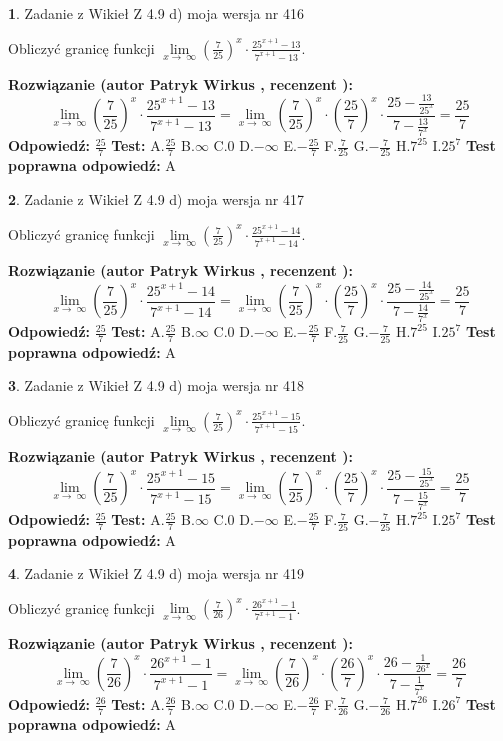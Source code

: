 \documentclass[12pt, a4paper]{article}
\theoremstyle{definition} %
\newtheorem{zad}{}
\newcommand{\zadStart}[1]{\begin{zad}#1\newline}
\newcommand{\zadStop}{\end{zad}}
\newcommand{\rozwStart}[2]{\noindent \textbf{Rozwiązanie (autor #1 , recenzent #2): }\newline}
\newcommand{\rozwStop}{\newline}
\newcommand{\odpStart}{\noindent \textbf{Odpowiedź:}\newline}
\newcommand{\odpStop}{\newline}
\newcommand{\testStart}{\noindent \textbf{Test:}\newline}
\newcommand{\testStop}{\newline}
\newcommand{\kluczStart}{\noindent \textbf{Test poprawna odpowiedź:}\newline}
\newcommand{\kluczStop}{\newline}
\begin{document}
\zadStart{Zadanie z Wikieł Z 4.9 d) moja wersja nr 416}


Obliczyć granicę funkcji  $\lim\limits_{x\to\ \infty}(\frac{7}{25})^{x}\cdot\frac{25^{x+1}-13}{7^{x+1}-13}$.
\zadStop
\rozwStart{Patryk Wirkus}{}
$$\lim\limits_{x\to\ \infty}(\frac{7}{25})^{x}\cdot\frac{25^{x+1}-13}{7^{x+1}-13}=\lim\limits_{x\to\ \infty}(\frac{7}{25})^{x}\cdot(\frac{25}{7})^{x} \cdot \frac{25-\frac{13}{25^{x}}}{7-\frac{13}{7^{x}}} = \frac{25}{7}$$
\rozwStop
\odpStart
$\frac{25}{7}$
\odpStop
\testStart
A.$\frac{25}{7}$ B.$\infty$ C.$0$ D.$-\infty$ E.$-\frac{25}{7}$
F.$\frac{7}{25}$ G.$-\frac{7}{25}$
H.$7^{25}$
I.$25^{7}$
\testStop
\kluczStart
A
\kluczStop



\zadStart{Zadanie z Wikieł Z 4.9 d) moja wersja nr 417}


Obliczyć granicę funkcji  $\lim\limits_{x\to\ \infty}(\frac{7}{25})^{x}\cdot\frac{25^{x+1}-14}{7^{x+1}-14}$.
\zadStop
\rozwStart{Patryk Wirkus}{}
$$\lim\limits_{x\to\ \infty}(\frac{7}{25})^{x}\cdot\frac{25^{x+1}-14}{7^{x+1}-14}=\lim\limits_{x\to\ \infty}(\frac{7}{25})^{x}\cdot(\frac{25}{7})^{x} \cdot \frac{25-\frac{14}{25^{x}}}{7-\frac{14}{7^{x}}} = \frac{25}{7}$$
\rozwStop
\odpStart
$\frac{25}{7}$
\odpStop
\testStart
A.$\frac{25}{7}$ B.$\infty$ C.$0$ D.$-\infty$ E.$-\frac{25}{7}$
F.$\frac{7}{25}$ G.$-\frac{7}{25}$
H.$7^{25}$
I.$25^{7}$
\testStop
\kluczStart
A
\kluczStop



\zadStart{Zadanie z Wikieł Z 4.9 d) moja wersja nr 418}


Obliczyć granicę funkcji  $\lim\limits_{x\to\ \infty}(\frac{7}{25})^{x}\cdot\frac{25^{x+1}-15}{7^{x+1}-15}$.
\zadStop
\rozwStart{Patryk Wirkus}{}
$$\lim\limits_{x\to\ \infty}(\frac{7}{25})^{x}\cdot\frac{25^{x+1}-15}{7^{x+1}-15}=\lim\limits_{x\to\ \infty}(\frac{7}{25})^{x}\cdot(\frac{25}{7})^{x} \cdot \frac{25-\frac{15}{25^{x}}}{7-\frac{15}{7^{x}}} = \frac{25}{7}$$
\rozwStop
\odpStart
$\frac{25}{7}$
\odpStop
\testStart
A.$\frac{25}{7}$ B.$\infty$ C.$0$ D.$-\infty$ E.$-\frac{25}{7}$
F.$\frac{7}{25}$ G.$-\frac{7}{25}$
H.$7^{25}$
I.$25^{7}$
\testStop
\kluczStart
A
\kluczStop



\zadStart{Zadanie z Wikieł Z 4.9 d) moja wersja nr 419}


Obliczyć granicę funkcji  $\lim\limits_{x\to\ \infty}(\frac{7}{26})^{x}\cdot\frac{26^{x+1}-1}{7^{x+1}-1}$.
\zadStop
\rozwStart{Patryk Wirkus}{}
$$\lim\limits_{x\to\ \infty}(\frac{7}{26})^{x}\cdot\frac{26^{x+1}-1}{7^{x+1}-1}=\lim\limits_{x\to\ \infty}(\frac{7}{26})^{x}\cdot(\frac{26}{7})^{x} \cdot \frac{26-\frac{1}{26^{x}}}{7-\frac{1}{7^{x}}} = \frac{26}{7}$$
\rozwStop
\odpStart
$\frac{26}{7}$
\odpStop
\testStart
A.$\frac{26}{7}$ B.$\infty$ C.$0$ D.$-\infty$ E.$-\frac{26}{7}$
F.$\frac{7}{26}$ G.$-\frac{7}{26}$
H.$7^{26}$
I.$26^{7}$
\testStop
\kluczStart
A
\kluczStop
\end{document}
